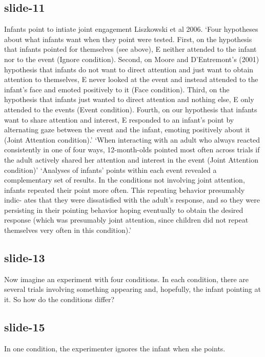 \documentclass[12pt,\papersize]{extarticle}
\begin{document}
\subsection{slide-11}
Infants point to intiate joint engagement Liszkowski et al 2006.
‘Four hypotheses about what infants want when they point were tested. First, on the hypothesis that infants pointed for themselves (see above), E neither attended to the infant nor to the event (Ignore condition). Second, on Moore and D’Entremont’s (2001) hypothesis that infants do not want to direct attention and just want to obtain attention to themselves, E never looked at the event and instead attended to the infant’s face and emoted positively to it (Face condition). Third, on the hypothesis that infants just wanted to direct attention and nothing else, E only attended to the events (Event condition). Fourth, on our hypothesis that infants want to share attention and interest, E responded to an infant’s point by alternating gaze between the event and the infant, emoting positively about it (Joint Attention condition).’ \citep{Liszkowski:2007mm}
‘When interacting with an adult who always reacted consistently in one of four ways, 12-month-olds pointed most often across trials if the adult actively shared her attention and interest in the event (Joint Attention condition)’ \citep[p.\ 305]{liszkowski:2004_twelve}
‘Analyses of infants’ points within each event revealed a complementary set of results. In the conditions not involving joint attention, infants repeated their point more often. This repeating behavior presumably indic- ates that they were dissatisfied with the adult’s response, and so they were persisting in their pointing behavior hoping eventually to obtain the desired response (which was presumably joint attention, since children did not repeat themselves very often in this condition).’ \citep{Liszkowski:2007mm}
 
 
\subsection{slide-13}
Now imagine an experiment with four conditions.
In each condition, there are several trials involving something appearing and, hopefully, the infant pointing at it.
So how do the conditions differ?
 
 
\subsection{slide-15}
In one condition, the experimenter ignores the infant when she points.
 
\end{document}
